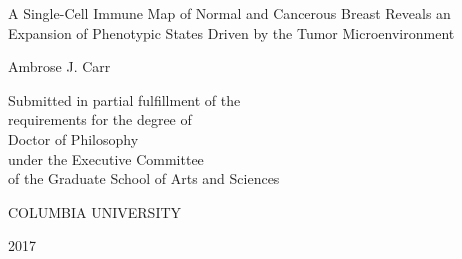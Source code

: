 
\thispagestyle{empty} %
\begin{center}
  \SingleSpace

  \vspace*{1in}

  A Single-Cell Immune Map of Normal and Cancerous Breast Reveals an Expansion of Phenotypic States Driven by the Tumor Microenvironment 

  \bigskip %

  Ambrose J. Carr

  \vspace{5in}

  Submitted in partial fulfillment of the\\
  requirements for the degree of\\
  Doctor of Philosophy\\
  under the Executive Committee\\
  of the Graduate School of Arts and Sciences\\

  \bigskip
  \bigskip

  COLUMBIA UNIVERSITY

  \bigskip %

  2017
\end{center}
